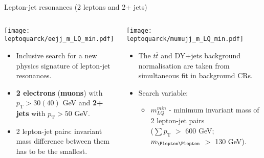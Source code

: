 \documentclass[8pt]{beamer}
\begin{document}
\begin{frame}{\large Lepton-jet resonances {\small (2 leptons and 2+ jets)}}

  \begin{columns}
   \begin{column}{6cm}
    \texttt{[image: leptoquarck/eejj\_m\_LQ\_min.pdf]}\\
    \begin{itemize}
     \item Inclusive search for a new physics signature of lepton-jet resonances.
     \item {\bf 2 electrons} ({\bf muons}) with $p_\mathrm{T}>30(40)$ GeV and {\bf 2+ jets} with $p_\mathrm{T}>50$ GeV.
     \item 2 lepton-jet pairs: invariant mass difference between them has to be the smallest.
    \end{itemize}
   \end{column}
   \begin{column}{6cm}
    \texttt{[image: leptoquarck/mumujj\_m\_LQ\_min.pdf]}\\
    \begin{itemize}
    \item The $t\overline{t}$ and DY+jets background normalisation are taken from 
	   simultaneous fit in background CRs.
    \vspace{0.2cm}
     \item Search variable:
     \begin{itemize}
      \item $m^{min}_{LQ}$ - minimum invariant mass of 2 lepton-jet pairs\\ {\small ($\sum p_\mathrm{T}$ $>$ 600 GeV; $m_{\Plepton\Plepton}$ $>$ 130 GeV)}.
     \end{itemize}

    \end{itemize}

   \end{column}
  \end{columns}
\end{frame}
\end{document}
